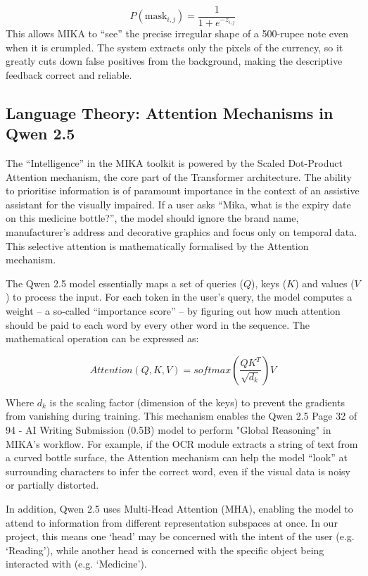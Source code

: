 \documentclass[12pt,a4paper]{report}
\begin{document}
\begin{equation}
P(\text{mask}_{i,j}) = \frac{1}{1 + e^{-z_{i,j}}}
\end{equation}
This allows MIKA to “see” the precise irregular shape of a 500-rupee note even when it is crumpled. The system extracts only the pixels of the currency, so it greatly cuts down false positives from the background, making the descriptive feedback correct and reliable. 
\subsection{Language Theory: Attention Mechanisms in Qwen 2.5}
 
The “Intelligence” in the MIKA toolkit is powered by the Scaled Dot-Product Attention mechanism, the core part of the Transformer architecture. The ability to prioritise information is of paramount importance in the context of an assistive assistant for the visually impaired. If a user asks “Mika, what is the expiry date on this medicine bottle?”, the model should ignore the brand name, manufacturer’s address and decorative graphics and focus only on temporal data. This selective attention is mathematically formalised by the Attention mechanism.
 
\noindent The Qwen 2.5 model essentially maps a set of queries ($Q$), keys ($K$) and values ($V$) to process the input. For each token in the user’s query, the model computes a weight – a so-called “importance score” – by figuring out how much attention should be paid to each word by every other word in the sequence. The mathematical operation can be expressed as:
 
\begin{equation}
Attention(Q, K, V) = softmax\left(\frac{QK^T}{\sqrt{d_k}}\right)V
\end{equation}
 
\noindent Where $d_k$ is the scaling factor (dimension of the keys) to prevent the gradients from vanishing during training. This mechanism enables the Qwen 2.5 Page 32 of 94 - AI Writing Submission (0.5B) model to perform "Global Reasoning" in MIKA's workflow. For example, if the OCR module extracts a string of text from a curved bottle surface, the Attention mechanism can help the model “look” at surrounding characters to infer the correct word, even if the visual data is noisy or partially distorted.
 
\noindent In addition, Qwen 2.5 uses Multi-Head Attention (MHA), enabling the model to attend to information from different representation subspaces at once. In our project, this means one ‘head’ may be concerned with the intent of the user (e.g. ‘Reading’), while another head is concerned with the specific object being interacted with (e.g. ‘Medicine’).
 
\end{document}
